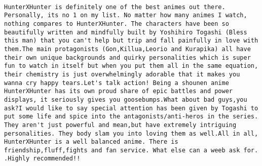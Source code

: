 \documentclass[
]{article}
\begin{document}
\begin{verbatim}
                                                                                                                                                                                                                                                                                                                                                                                                                                                                                HunterXHunter is definitely one of the best animes out there. Personally, its no 1 on my list. No matter how many animes I watch, nothing compares to HunterXHunter. The characters have been so beautifully written and mindfully built by Yoshihiro Togashi (Bless this man) that you can't help but trip and fall painfully in love with them.The main protagonists (Gon,Killua,Leorio and Kurapika) all have their own unique backgrounds and quirky personalities which is super fun to watch in itself but when you put them all in the same equation, their chemistry is just overwhelmingly adorable that it makes you wanna cry happy tears.Let's talk action! Being a shounen anime HunterXHunter has its own proud share of epic battles and power displays, it seriously gives you goosebumps.What about bad guys,you ask?I would like to say special attention has been given by Togashi to put some life and spice into the antagonists/anti-heros in the series. They aren't just powerful and mean,but have extremely intriguing personalities. They body slam you into loving them as well.All in all, HunterXHunter is a well balanced anime. There is friendship,fluff,fights and fan service. What else can a weeb ask for. .Highly recommended!!

\end{verbatim}
\end{document}
